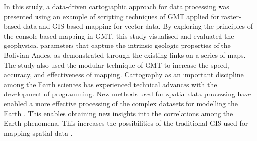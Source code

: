\documentclass[data,article,accept,pdftex,moreauthors]{Definitions/mdpi}
\begin{document}
In this study, a {data-driven} cartographic approach for data processing was presented using an example of scripting techniques of GMT applied for raster-based data and {}GIS-based mapping for vector data. By exploring {the} principles of {the} console-based mapping in {GMT, }this study {visualised and evaluated} the geophysical parameters that capture the intrinsic geologic properties of the Bolivian Andes{, as demonstrated through} the existing links {on} a series of maps. The study also {used} the modular technique of GMT to increase the speed, accuracy, and effectiveness of mapping. {Cartography as an important discipline among the} Earth sciences has experienced {technical advances with the development of programming}. {New methods used for} spatial data processing{ have enabled a more effective processing of the complex datasets for modelling the Earth} \cite{Bar,LOMBARDO,Lemenkova2020e}. {This enables obtaining} new insights into the correlations among the Earth phenomena{. This increases the possibilities of the traditional }GIS {used for mapping} spatial data \cite{Millington,Lemenkova202137}. 	
\end{document}
